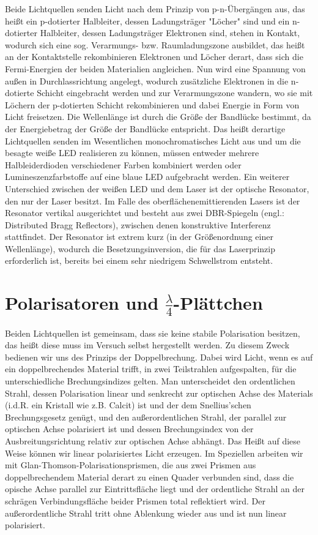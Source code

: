 \documentclass[bigchapter,colorback,accentcolor=tud4b,linedtoc,11pt]{tudreport}
\begin{document}
Beide Lichtquellen senden Licht nach dem Prinzip von p-n-Übergängen aus, das heißt ein p-dotierter Halbleiter, dessen Ladungsträger "Löcher" sind und ein n-dotierter Halbleiter, dessen Ladungsträger Elektronen sind, stehen in Kontakt, wodurch sich eine sog. Verarmungs- bzw. Raumladungszone ausbildet, das heißt an der Kontaktstelle rekombinieren Elektronen und Löcher derart, dass sich die Fermi-Energien der beiden Materialien angleichen. Nun wird eine Spannung von außen in Durchlassrichtung angelegt, wodurch zusätzliche Elektronen in die n-dotierte Schicht eingebracht werden und zur Verarmungszone wandern, wo sie mit Löchern der p-dotierten Schicht rekombinieren und dabei Energie in Form von Licht freisetzen. Die Wellenlänge ist durch die Größe der Bandlücke bestimmt, da der Energiebetrag der Größe der Bandlücke entspricht. Das heißt derartige Lichtquellen senden im Wesentlichen monochromatisches Licht aus und um die besagte weiße LED realisieren zu können, müssen entweder mehrere Halbleiderdioden verschiedener Farben kombiniert werden oder Lumineszenzfarbstoffe auf eine blaue LED aufgebracht werden. Ein weiterer Unterschied zwischen der weißen LED und dem Laser ist der optische Resonator, den nur der Laser besitzt. Im Falle des oberflächenemittierenden Lasers ist der Resonator vertikal ausgerichtet und besteht aus zwei DBR-Spiegeln (engl.: Distributed Bragg Reflectors), zwischen denen konstruktive Interferenz stattfindet. Der Resonator ist extrem kurz (in der Größenordnung einer Wellenlänge), wodurch die Besetzungsinversion, die für das Laserprinzip erforderlich ist, bereits bei einem sehr niedrigem Schwellstrom entsteht.

\section{Polarisatoren und $\frac{\lambda}{4}$-Plättchen}
Beiden Lichtquellen ist gemeinsam, dass sie keine stabile Polarisation besitzen, das heißt diese muss im Versuch selbst hergestellt werden. Zu diesem Zweck bedienen wir uns des Prinzips der Doppelbrechung. Dabei wird Licht, wenn es auf ein doppelbrechendes Material trifft, in zwei Teilstrahlen aufgespalten, für die unterschiedliche Brechungsindizes gelten. Man unterscheidet den ordentlichen Strahl, dessen Polarisation linear und senkrecht zur optischen Achse des Materials (i.d.R. ein Kristall wie z.B. Calcit) ist und der dem Snellius'schen Brechungsgesetz genügt, und den außerordentlichen Strahl, der parallel zur optischen Achse polarisiert ist und dessen Brechungsindex von der Ausbreitungsrichtung relativ zur optischen Achse abhängt. Das Heißt auf diese Weise können wir linear polarisiertes Licht erzeugen. Im Speziellen arbeiten wir mit Glan-Thomson-Polarisationsprismen, die aus zwei Prismen aus doppelbrechendem Material derart zu einen Quader verbunden sind, dass die opische Achse parallel zur Eintrittsfläche liegt und der ordentliche Strahl an der schrägen Verbindungsfläche beider Prismen total reflektiert wird. Der außerordentliche Strahl tritt ohne Ablenkung wieder aus und ist nun linear polarisiert.
\end{document}
